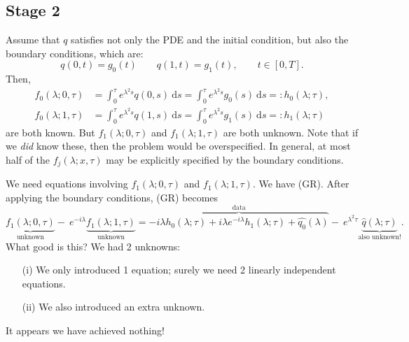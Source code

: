 
\subsection*{Stage 2}
Assume that $q$ satisfies not only the PDE and the initial condition, but also the boundary conditions, which are:
\[ 
q(0,t) = g_0(t) \qquad q(1,t) = g_1(t), \qquad t \in [0, T].
\]
Then, 
\begin{align*}
f_0(\lambda;  0, \tau) &= \int^{\tau}_0 e^{\lambda^2 s} q(0,s) ~\mathrm{d}s =  \int^{\tau}_0 e^{\lambda^2 s} g_0(s) ~\mathrm{d}s =: h_0(\lambda; \tau), \\
f_0(\lambda;  1, \tau) &= \int^{\tau}_0 e^{\lambda^2 s} q(1,s) ~\mathrm{d}s =  \int^{\tau}_0 e^{\lambda^2 s} g_1(s) ~\mathrm{d}s =: h_1(\lambda; \tau)
\end{align*}
are both known. But $f_1(\lambda;  0, \tau)$ and $f_1(\lambda;  1, \tau)$ are both unknown. Note that if we \emph{did} know these, then the problem would be overspecified. In general, at most half of the $f_j(\lambda;  x, \tau)$ may be explicitly specified by the boundary conditions. 

We need equations involving $f_1(\lambda;  0, \tau)$ and $f_1(\lambda;  1, \tau).$ We have (GR). After applying the boundary conditions, (GR) becomes 
\[ 
\underbrace{f_1(\lambda;  0, \tau)}_\text{unknown} -~ e^{-i \lambda}\underbrace{f_1(\lambda;  1, \tau)}_\text{unknown}= \overbrace{- i \lambda h_0(\lambda; \tau) + i \lambda e^{-i\lambda} h_1(\lambda; \tau)  + \widehat{q_0}(\lambda)}^\text{data} -~ e^{\lambda^2 \tau} \underbrace{\widehat{q}(\lambda; \tau)}_\text{also unknown!}.
\] 
What good is this? We had 2 unknowns:
\begin{enumerate}
\item[(i)] We only introduced 1 equation; surely we need 2 linearly independent equations.
\item[(ii)] We also introduced an extra unknown.
\end{enumerate}
It appears we have achieved nothing!

